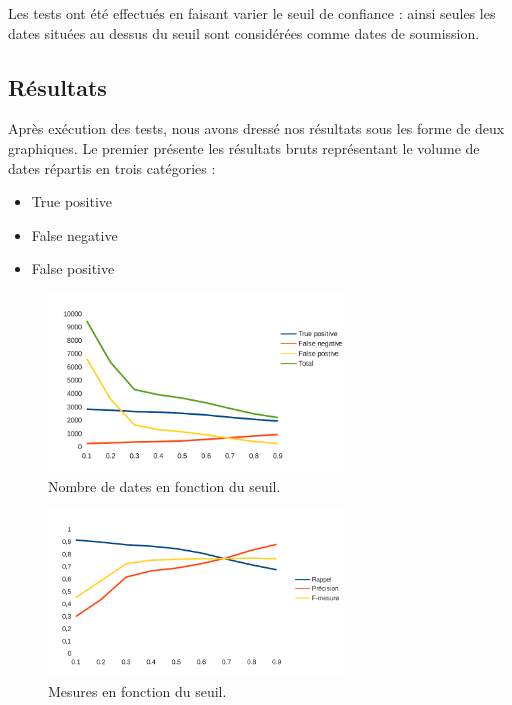 \documentclass[a4paper,french,10pt]{article}
\begin{document}
Les tests ont été effectués en faisant varier le seuil de confiance : ainsi seules les dates situées au dessus du seuil sont considérées comme dates de soumission.

\subsection{Résultats}

Après exécution des tests, nous avons dressé nos résultats sous les forme de deux graphiques. Le premier présente les résultats bruts représentant le volume de dates répartis en trois catégories : 

\begin{itemize}
\item True positive
\item False negative
\item False positive
\end{itemize}

\begin{figure}[H]
\centering
\includegraphics[width=0.7\textwidth]{files/eval_total}
\caption{Nombre de dates en fonction du seuil.}
\label{fig:eval_total}
\end{figure}

\begin{figure}[H]
\centering
\includegraphics[width=0.7\textwidth]{files/eval_mesures}
\caption{Mesures en fonction du seuil.}
\label{fig:eval_mesures}
\end{figure}
\end{document}
